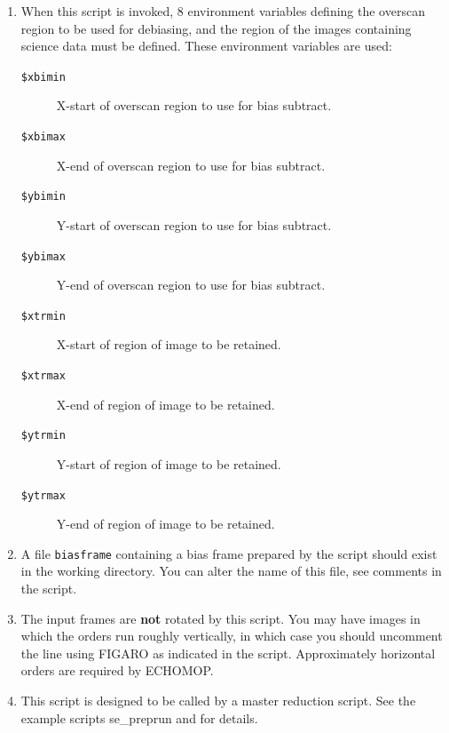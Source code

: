 \documentclass[twoside,11pt]{starlink}
\begin{document}
\begin{description}
\begin{enumerate}
\item When this script is invoked, 8 environment variables defining
      the overscan region to be used for debiasing, and the region
      of the images containing science data must be defined.
      These environment variables are used:

\begin{description}

\item [{\tt{\$xbimin}}]
           X-start of overscan region to use for bias subtract.

\item [{\tt{\$xbimax}}]
           X-end of overscan region to use for bias subtract.

\item [{\tt{\$ybimin}}]
           Y-start of overscan region to use for bias subtract.

\item [{\tt{\$ybimax}}]
           Y-end of overscan region to use for bias subtract.

\item [{\tt{\$xtrmin}}]
           X-start of region of image to be retained.

\item [{\tt{\$xtrmax}}]
           X-end of region of image to be retained.

\item [{\tt{\$ytrmin}}]
           Y-start of region of image to be retained.

\item [{\tt{\$ytrmax}}]
           Y-end of region of image to be retained.


\end{description}

\item A file \verb+biasframe+ containing a bias frame prepared by the
      script  should exist in
      the working directory.
      You can alter the name of this file, see comments in the
      script.

\item The input frames are \textbf{not} rotated by this script.  You may
      have images in which the orders run roughly vertically,
      in which case you should uncomment the line using FIGARO
       as indicated in the script.
      Approximately horizontal orders are required by ECHOMOP.

\item This script is designed to be called by a master reduction
      script.  See the example scripts 
      {se_preprun}
      and  for details.

\end{enumerate}
\end{description}
\end{document}
